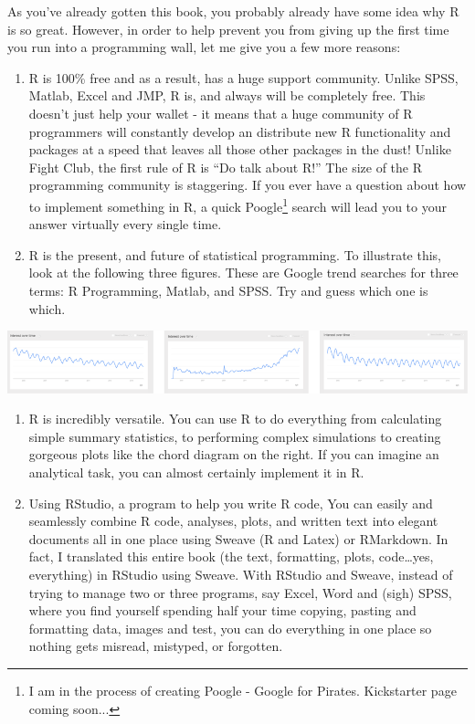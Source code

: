 \documentclass[]{book}
\let\rmarkdownfootnote\footnote%
\def\footnote{\protect\rmarkdownfootnote}
\theoremstyle{definition}
\theoremstyle{definition}
\theoremstyle{remark}
\begin{document}
As you've already gotten this book, you probably already have some idea
why R is so great. However, in order to help prevent you from giving up
the first time you run into a programming wall, let me give you a few
more reasons:

\begin{enumerate}
\def\labelenumi{\arabic{enumi}.}
\item
  R is 100\% free and as a result, has a huge support community. Unlike
  SPSS, Matlab, Excel and JMP, R is, and always will be completely free.
  This doesn't just help your wallet - it means that a huge community of
  R programmers will constantly develop an distribute new R
  functionality and packages at a speed that leaves all those other
  packages in the dust! Unlike Fight Club, the first rule of R is ``Do
  talk about R!'' The size of the R programming community is staggering.
  If you ever have a question about how to implement something in R, a
  quick
  Poogle\footnote{I am in the process of creating Poogle - Google for Pirates. Kickstarter page coming soon...}
  search will lead you to your answer virtually every single time.
\item
  R is the present, and future of statistical programming. To illustrate
  this, look at the following three figures. These are Google trend
  searches for three terms: R Programming, Matlab, and SPSS. Try and
  guess which one is which.
\end{enumerate}

\includegraphics[width=12.76in]{images/googletrends}

\begin{enumerate}
\def\labelenumi{\arabic{enumi}.}
\setcounter{enumi}{2}
\item
  R is incredibly versatile. You can use R to do everything from
  calculating simple summary statistics, to performing complex
  simulations to creating gorgeous plots like the chord diagram on the
  right. If you can imagine an analytical task, you can almost certainly
  implement it in R.
\item
  Using RStudio, a program to help you write R code, You can easily and
  seamlessly combine R code, analyses, plots, and written text into
  elegant documents all in one place using Sweave (R and Latex) or
  RMarkdown. In fact, I translated this entire book (the text,
  formatting, plots, code\ldots{}yes, everything) in RStudio using
  Sweave. With RStudio and Sweave, instead of trying to manage two or
  three programs, say Excel, Word and (sigh) SPSS, where you find
  yourself spending half your time copying, pasting and formatting data,
  images and test, you can do everything in one place so nothing gets
  misread, mistyped, or forgotten.
\end{enumerate}
\end{document}
